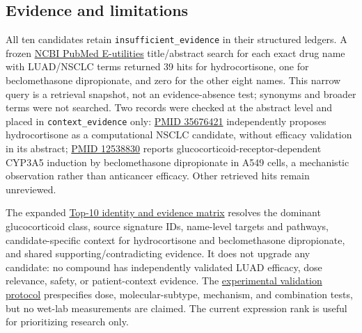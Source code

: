 \documentclass[
  10pt,
]{ctexart}
\begin{document}
\subsection{Evidence and limitations}\label{evidence-and-limitations}

All ten candidates retain \texttt{insufficient\_\allowbreak{}evidence} in their
structured ledgers. A frozen
\href{https://www.ncbi.nlm.nih.gov/books/NBK25499/}{NCBI PubMed
E-utilities} title/abstract search for each exact drug name with
LUAD/NSCLC terms returned 39 hits for hydrocortisone, one for
beclomethasone dipropionate, and zero for the other eight names. This
narrow query is a retrieval snapshot, not an evidence-absence test;
synonyms and broader terms were not searched. Two records were checked
at the abstract level and placed in \texttt{context\_\allowbreak{}evidence} only:
\href{https://pubmed.ncbi.nlm.nih.gov/35676421/}{PMID 35676421}
independently proposes hydrocortisone as a computational NSCLC
candidate, without efficacy validation in its abstract;
\href{https://pubmed.ncbi.nlm.nih.gov/12538830/}{PMID 12538830} reports
glucocorticoid-receptor-dependent CYP3A5 induction by beclomethasone
dipropionate in A549 cells, a mechanistic observation rather than
anticancer efficacy. Other retrieved hits remain unreviewed.

The expanded \href{luad_top10_evidence_matrix.md}{Top-10 identity and
evidence matrix} resolves the dominant glucocorticoid class, source
signature IDs, name-level targets and pathways, candidate-specific
context for hydrocortisone and beclomethasone dipropionate, and shared
supporting/contradicting evidence. It does not upgrade any candidate: no
compound has independently validated LUAD efficacy, dose relevance,
safety, or patient-context evidence. The
\href{luad_experimental_validation_protocol.md}{experimental validation
protocol} prespecifies dose, molecular-subtype, mechanism, and
combination tests, but no wet-lab measurements are claimed. The current
expression rank is useful for prioritizing research only.
\end{document}
